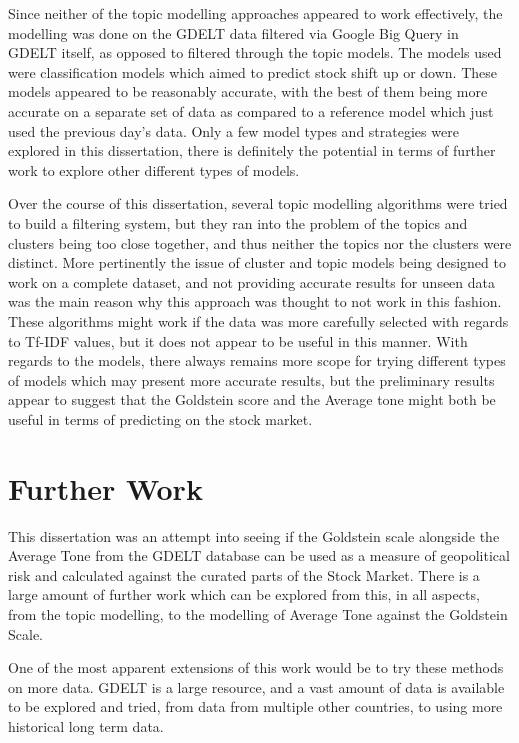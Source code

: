 Since neither of the topic modelling approaches appeared to work effectively, the modelling was done on the GDELT data filtered via Google Big Query in GDELT itself, as opposed to filtered through the topic models. The models used were classification models which aimed to predict stock shift up or down. These models appeared to be reasonably accurate, with the best of them being more accurate on a separate set of data as compared to a reference model which just used the previous day's data. Only a few model types and strategies were explored in this dissertation, there is definitely the potential in terms of further work to explore other different types of models.

Over the course of this dissertation, several topic modelling algorithms were tried to build a filtering system, but they ran into the problem of the topics and clusters being too close together, and thus neither the topics nor the clusters were distinct. More pertinently the issue of cluster and topic models being designed to work on a complete dataset, and not providing accurate results for unseen data was the main reason why this approach was thought to not work in this fashion. These algorithms might work if the data was more carefully selected with regards to Tf-IDF values, but it does not appear to be useful in this manner. With regards to the models, there always remains more scope for trying different types of models which may present more accurate results, but the preliminary results appear to suggest that the Goldstein score and the Average tone might both be useful in terms of predicting on the stock market.


\section{Further Work}
This dissertation was an attempt into seeing if the Goldstein scale alongside the Average Tone from the GDELT database can be used as a measure of geopolitical risk and calculated against the curated parts of the Stock Market. There is a large amount of further work which can be explored from this, in all aspects, from the topic modelling, to the modelling of Average Tone against the Goldstein Scale. 

One of the most apparent extensions of this work would be to try these methods on more data. GDELT is a large resource, and a vast amount of data is available to be explored and tried, from data from multiple other countries, to using more historical long term data. 

